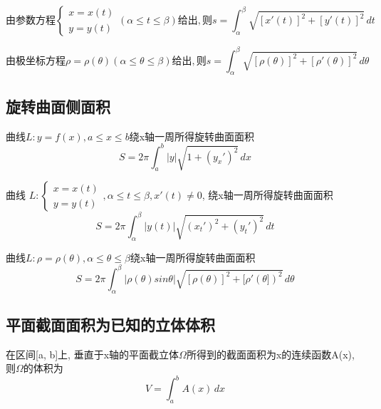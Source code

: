 \begin{displaymath}
由参数方程
\begin{cases}
x = x(t) \\
y = y(t)
\end{cases}
(\alpha \leq t \leq \beta)给出,
则s = \int_{\alpha}^{\beta} \sqrt{[x'(t)]^2 + [y'(t)]^2} \,dt
\end{displaymath}

\begin{displaymath}
由极坐标方程\rho = \rho(\theta)(\alpha \leq \theta \leq \beta)给出,
则s = \int_{\alpha}^{\beta} \sqrt{[\rho(\theta)]^2 + [\rho'(\theta)]^2} \,d\theta
\end{displaymath}


\subsection{旋转曲面侧面积}

曲线\(L : y = f(x), a \leq x \leq b\)绕x轴一周所得旋转曲面面积
\begin{displaymath}
S = 2\pi \int_{a}^{b}|y|\sqrt{1 + (y_x')^2} \,dx
\end{displaymath}

曲线
\(
L : 
\begin{cases}
x = x(t) \\
y = y(t)
\end{cases},
\alpha \leq t \leq \beta, x'(t) \neq 0
\),
绕x轴一周所得旋转曲面面积
\begin{displaymath}
S = 2\pi \int_{\alpha}^{\beta}|y(t)|\sqrt{(x_t')^2 + (y_t')^2} \,dt
\end{displaymath}

曲线\(L : \rho = \rho(\theta), \alpha \leq \theta \leq \beta\)绕x轴一周所得旋转曲面面积
\begin{displaymath}
S = 2\pi \int_{\alpha}^{\beta}|\rho(\theta)sin\theta|
\sqrt{[\rho(\theta)]^2 + [\rho'(\theta])^2} \,d\theta
\end{displaymath}


\subsection{平面截面面积为已知的立体体积}

在区间[a, b]上, 垂直于x轴的平面截立体\(\Omega\)所得到的截面面积为x的连续函数A(x), 则\(\Omega\)的体积为
\begin{displaymath}
V = \int_{a}^{b} A(x) \,dx
\end{displaymath}


